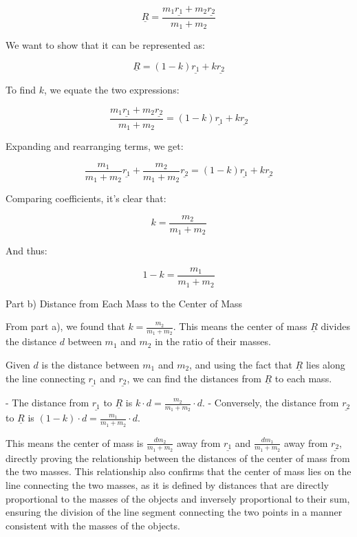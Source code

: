 \documentclass[a4paper,11pt]{article}
\begin{document}
\[ \underline{R} = \frac{m_{1}\underline{r_{1}} + m_{2}\underline{r_{2}}}{m_{1} + m_{2}} \]

We want to show that it can be represented as:

\[ \underline{R} = (1-k)\underline{r_{1}} + k\underline{r_{2}} \]

To find \( k \), we equate the two expressions:

\[ \frac{m_{1}\underline{r_{1}} + m_{2}\underline{r_{2}}}{m_{1} + m_{2}} = (1-k)\underline{r_{1}} + k\underline{r_{2}} \]

Expanding and rearranging terms, we get:

\[ \frac{m_{1}}{m_{1} + m_{2}}\underline{r_{1}} + \frac{m_{2}}{m_{1} + m_{2}}\underline{r_{2}} = (1-k)\underline{r_{1}} + k\underline{r_{2}} \]

Comparing coefficients, it's clear that:

\[ k = \frac{m_{2}}{m_{1} + m_{2}} \]

And thus:

\[ 1-k = \frac{m_{1}}{m_{1} + m_{2}} \]

Part b) Distance from Each Mass to the Center of Mass

From part a), we found that \( k = \frac{m_{2}}{m_{1} + m_{2}} \). This means the center of mass \( \underline{R} \) divides the distance \( d \) between \( m_{1} \) and \( m_{2} \) in the ratio of their masses.

Given \( d \) is the distance between \( m_{1} \) and \( m_{2} \), and using the fact that \( \underline{R} \) lies along the line connecting \( \underline{r_{1}} \) and \( \underline{r_{2}} \), we can find the distances from \( \underline{R} \) to each mass.

- The distance from \( \underline{r_{1}} \) to \( \underline{R} \) is \( k \cdot d = \frac{m_{2}}{m_{1} + m_{2}} \cdot d \).
- Conversely, the distance from \( \underline{r_{2}} \) to \( \underline{R} \) is \( (1-k) \cdot d = \frac{m_{1}}{m_{1} + m_{2}} \cdot d \).

This means the center of mass is \( \frac{d m_{2}}{m_{1} + m_{2}} \) away from \( \underline{r_{1}} \) and \( \frac{d m_{1}}{m_{1} + m_{2}} \) away from \( \underline{r_{2}} \), directly proving the relationship between the distances of the center of mass from the two masses. This relationship also confirms that the center of mass lies on the line connecting the two masses, as it is defined by distances that are directly proportional to the masses of the objects and inversely proportional to their sum, ensuring the division of the line segment connecting the two points in a manner consistent with the masses of the objects. \\
\end{document}
